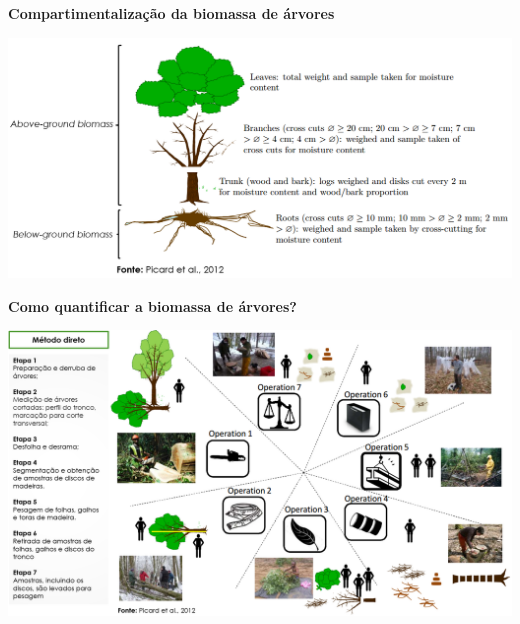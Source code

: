 \documentclass[12pt,ignorenonframetext,aspectratio=1610]{beamer}
\begin{document}
\begin{frame}[c]{}
		
		\textbf{Compartimentalização da biomassa de árvores}
		
	\begin{center}
		\includegraphics[scale=0.47]{Fig/Biomass3}
	\end{center}
	
\end{frame}

\begin{frame}[c]{}
		
		\textbf{Como quantificar a biomassa de árvores?}
			
	\begin{center}
		\includegraphics[scale=0.35]{Fig/Biomass2}
	\end{center}
	
\end{frame}
\end{document}

